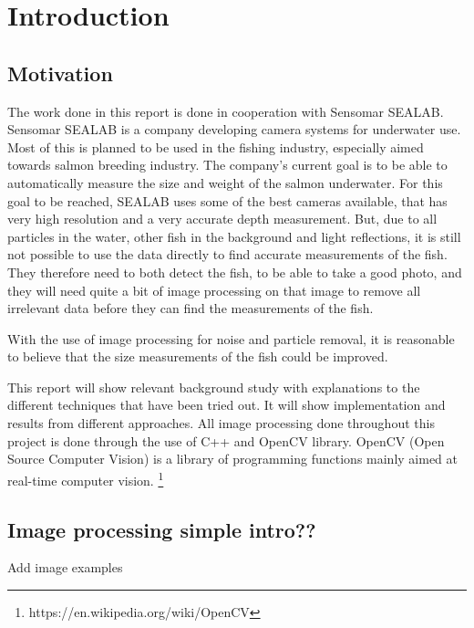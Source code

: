 \section{Introduction}\label{introduction}

\subsection{Motivation}\label{motivation}
The work done in this report is done in cooperation with Sensomar SEALAB.
Sensomar SEALAB is a company developing camera systems for underwater use. Most of this is planned to be used in the fishing industry, especially aimed towards salmon breeding industry. The company's current goal is to be able to automatically measure the size and weight of the salmon underwater. For this goal to be reached, SEALAB uses some of the best cameras available, that has very high resolution and a very accurate depth measurement. But, due to all particles in the water, other fish in the background and light reflections, it is still not possible to use the data directly to find accurate measurements of the fish. They therefore need to both detect the fish, to be able to take a good photo, and they will need quite a bit of image processing on that image to remove all irrelevant data before they can find the measurements of the fish. 

With the use of image processing for noise and particle removal, it is reasonable to believe that the size measurements of the fish could be improved.

This report will show relevant background study with explanations to the different techniques that have been tried out. It will show implementation and results from different approaches. All image processing done throughout this project is done through the use of C++ and OpenCV library. OpenCV (Open Source Computer Vision) is a library of programming functions mainly aimed at real-time computer vision. \footnote{https://en.wikipedia.org/wiki/OpenCV}


\subsection{Image processing simple intro??}

{\color{red}Add image examples}



